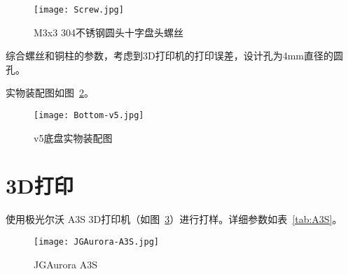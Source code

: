 \begin{figure}[htbp]
    \centering
    \texttt{[image: Screw.jpg]}
    \caption{M3x3 304不锈钢圆头十字盘头螺丝}
    \label{fig:Screw}
\end{figure}

综合螺丝和铜柱的参数，考虑到3D打印机的打印误差，设计孔为4mm直径的圆孔。

实物装配图如图~\ref{fig:Bottom-v5}。

\begin{figure}[htbp]
    \centering
    \texttt{[image: Bottom-v5.jpg]}
    \caption{v5底盘实物装配图}
    \label{fig:Bottom-v5}
\end{figure}

\section{3D打印}

使用极光尔沃 A3S 3D打印机（如图~\ref{fig:A3S}）进行打样。详细参数如表~\ref{tab:A3S}。

\begin{figure}[htbp]
    \centering
    \texttt{[image: JGAurora-A3S.jpg]}
    \caption{JGAurora A3S}
    \label{fig:A3S}
\end{figure}


